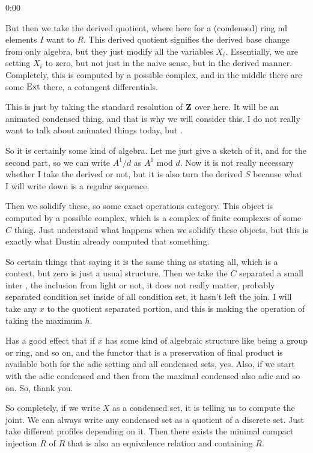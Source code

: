 \begin{unfinished}{0:00}
{\begin{theorem}
%
But then we take the derived quotient, where here for a (condensed) ring nd elements $I$ want to $R$. 
This derived quotient signifies the derived base change from only algebra, but they just modify all the variables $X_i$. 
Essentially, we are setting $X_i$ to zero, but not just in the naive sense, but in the derived manner. 
Completely, this is computed by a possible complex, and in the middle there are some $\operatorname{Ext}$ there, a cotangent differentials.

%
This is just by taking the standard resolution of $\mathbf Z$ over here. It will be an animated condensed thing, and that is why we will consider this. I do not really want to talk about animated things today, but .

%
So it is certainly some kind of algebra. Let me just give a sketch of it, and for the second part, so we can write $A^1/d$ as $A^1$ mod $d$. Now it is not really necessary whether I take the derived or not, but it is also turn the derived $S$ because what I will write down is a regular sequence.

%
Then we solidify these, so some exact operations category. This object is computed by a possible complex, which is a complex of finite complexes of some $C$ thing. Just understand what happens when we solidify these objects, but this is exactly what Dustin already computed that something.

%
So certain things that saying it is the same thing as stating all, which is a context, but zero is just a usual structure. Then we take the $C$ separated a small inter , the inclusion from light or not, it does not really matter, probably separated condition set inside of all condition set, it hasn't left the join. I will take any $x$ to the quotient separated portion, and this is making the operation of taking the maximum $h$.

%
Has a good effect that if $x$ has some kind of algebraic structure like being a group or ring, and so on, and the functor that is a preservation of final product is available both for the adic setting and all condensed sets, yes. 
Also, if we start with the adic condensed and then from the maximal condensed also adic and so on. So, thank you.

%
So completely, if we write $X$ as a condensed set, it is telling us to compute the joint. We can always write any condensed set as a quotient of a discrete set. Just take different profiles depending on it. Then there exists the minimal compact injection $\overline{R}$ of $R$ that is also an equivalence relation and containing $R$. 


\end{theorem}}
\end{unfinished}
